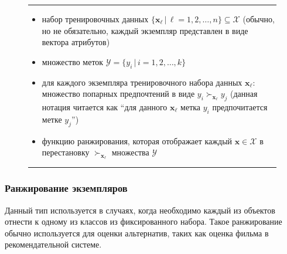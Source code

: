 	\begin{figure}[h!]
		\hrule
		\begin{description}[nosep]
			\item[Дано:] \null\leavevmode
			\begin{itemize}[itemsep=0pt,leftmargin=2ex,label=\textbf{---}]
				\item набор тренировочных данных $\{\bm{x}_\ell \, | \, \ell = 1,2,\dotsc,n\} \subseteq \mathcal{X} $ (обычно, но не обязательно, каждый экземпляр представлен в виде вектора атрибутов)
				\item множество меток $\mathcal{Y} = \{y_i\,|\,i = 1,2,\dotsc,k\}$
				\item для каждого экземпляра тренировочного набора данных $\bm{x}_\ell$: множество попарных предпочтений в виде $y_i \succ_{\bm{x}_\ell} y_j $ (данная нотация читается как ``для данного $\bm{x}_\ell$  метка $y_i$ предпочитается метке $y_j$'')
			\end{itemize}
			\item[Найти:] \null\leavevmode
			\begin{itemize}[itemsep=0pt,leftmargin=2ex,label=\textbf{---}]
				\item функцию ранжирования, которая отображает каждый $\bm{x} \in \mathcal{X}$ в перестановку $\succ_{\bm{x}_\ell}$ множества $\mathcal{Y}$
			\end{itemize}
		\end{description} 
		\hrule
		\label{fig:label_ranking}
	\end{figure}
	
	\subsubsection{Ранжирование экземпляров}
	Данный тип используется в случаях, когда необходимо каждый из объектов отнести к одному из классов из фиксированного набора. Такое ранжирование обычно используется для оценки альтернатив, таких как оценка фильма в рекомендательной системе.
	
